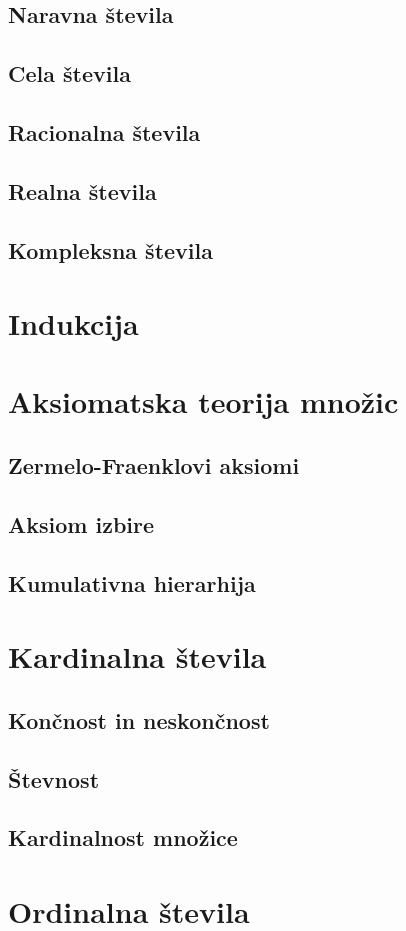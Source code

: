 \documentclass[11pt,a4paper,twoside]{book}
\begin{document}
                \section{Naravna števila}
                \section{Cela števila}
                \section{Racionalna števila}
                \section{Realna števila}
                \section{Kompleksna števila}

        \chapter{Indukcija}

        \chapter{Aksiomatska teorija množic}
                \section{Zermelo-Fraenklovi aksiomi}
                \section{Aksiom izbire}
                \section{Kumulativna hierarhija}

        \chapter{Kardinalna števila}
                \section{Končnost in neskončnost}
                \section{Števnost}
                \section{Kardinalnost množice}

        \chapter{Ordinalna števila}
\end{document}
